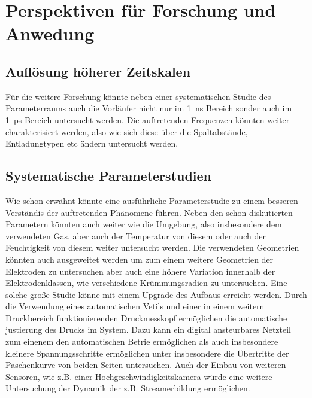 \section{Perspektiven für Forschung und Anwedung}

\subsection{Auflösung höherer Zeitskalen}
Für die weitere Forschung könnte neben einer systematischen Studie des Parameterraums auch die Vorläufer nicht nur im \SI{1}{\nano\second} Bereich sonder auch im \SI{1}{\pico\second} Bereich untersucht werden. Die auftretenden Frequenzen könnten weiter charakterisiert werden, also wie sich diese über die Spaltabstände, Entladungtypen etc ändern untersucht werden. 

\subsection{Systematische Parameterstudien}
Wie schon erwähnt könnte eine ausführliche Parameterstudie zu einem besseren Verständis der auftretenden Phänomene führen. Neben den schon diskutierten Parametern könnten auch weiter wie die Umgebung, also insbesondere dem verwendeten Gas, aber auch der Temperatur von diesem oder auch der Feuchtigkeit von diesem weiter untersucht werden. Die verwendeten Geometrien könnten auch ausgeweitet werden um zum einem weitere Geometrien der Elektroden zu untersuchen aber auch eine höhere Variation innerhalb der Elektrodenklassen, wie verschiedene Krümmungsradien zu untersuchen. Eine solche große Studie könne mit einem Upgrade des Aufbaus erreicht werden. Durch die Verwendung eines automatischen Vetils und einer in einem weitern Druckbereich funktionierenden Druckmesskopf ermöglichen die automatische justierung des Drucks im System. Dazu kann ein digital ansteurbares Netzteil zum einenem den automatischen Betrie ermöglichen als auch insbesondere kleinere Spannungsschritte ermöglichen unter insbesondere die Übertritte der Paschenkurve von beiden Seiten untersuchen. Auch der Einbau von weiteren Sensoren, wie z.B. einer Hochgeschwindigkeitskamera würde eine weitere Untersuchung der Dynamik der z.B. Streamerbildung ermöglichen. 


